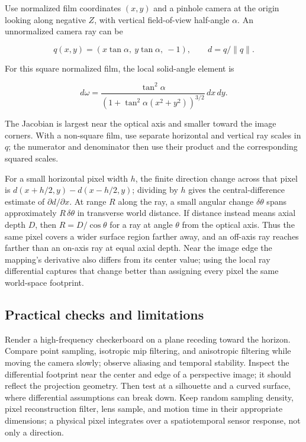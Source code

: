 \hypertarget{02-foundations-ii-ch036-worked-perspective-example}{}

Use normalized film coordinates \((x,y)\) and a pinhole camera at the origin looking along negative \(Z\), with vertical field-of-view half-angle \(\alpha\). An unnormalized camera ray can be

\[
q(x,y)=(x\tan\alpha,\ y\tan\alpha,\ -1),\qquad d=q/\|q\|.
\]

For this square normalized film, the local solid-angle element is

\[
d\omega=\frac{\tan^2\alpha}{\left(1+\tan^2\alpha(x^2+y^2)\right)^{3/2}}\,dx\,dy.
\]

The Jacobian is largest near the optical axis and smaller toward the image corners. With a non-square film, use separate horizontal and vertical ray scales in \(q\); the numerator and denominator then use their product and the corresponding squared scales.

For a small horizontal pixel width \(h\), the finite direction change across that pixel is \(d(x+h/2,y)-d(x-h/2,y)\); dividing by \(h\) gives the central-difference estimate of \(\partial d/\partial x\). At range \(R\) along the ray, a small angular change \(\delta\theta\) spans approximately \(R\,\delta\theta\) in transverse world distance. If distance instead means axial depth \(D\), then \(R=D/\cos\theta\) for a ray at angle \(\theta\) from the optical axis. Thus the same pixel covers a wider surface region farther away, and an off-axis ray reaches farther than an on-axis ray at equal axial depth. Near the image edge the mapping's derivative also differs from its center value; using the local ray differential captures that change better than assigning every pixel the same world-space footprint.

\subsection{Practical checks and limitations}\label{02-foundations-ii-ch036-practical-checks-and-limitations}

\hypertarget{02-foundations-ii-ch036-practical-checks-and-limitations}{}

Render a high-frequency checkerboard on a plane receding toward the horizon. Compare point sampling, isotropic mip filtering, and anisotropic filtering while moving the camera slowly; observe aliasing and temporal stability. Inspect the differential footprint near the center and edge of a perspective image; it should reflect the projection geometry. Then test at a silhouette and a curved surface, where differential assumptions can break down. Keep random sampling density, pixel reconstruction filter, lens sample, and motion time in their appropriate dimensions; a physical pixel integrates over a spatiotemporal sensor response, not only a direction.

